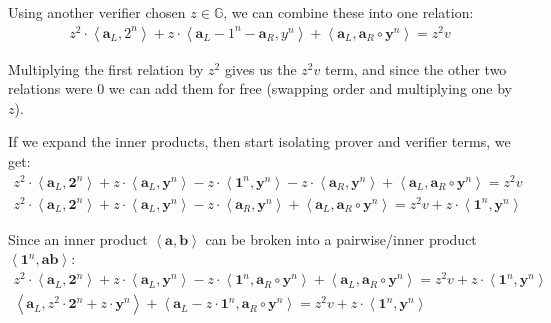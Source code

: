 \documentclass{article}
\begin{document}
Using another verifier chosen $z \in \mathbb{G}$, we can combine these into one relation:
\begin{align}
  z^2 \cdot \left<\textbf{a}_L, 2^n\right> + z \cdot \left<\textbf{a}_L - 1^n - \textbf{a}_R, y^n\right> + \left<\textbf{a}_L, \textbf{a}_R \circ \textbf{y}^n\right> = z^2 v
\end{align}

Multiplying the first relation by $z^2$ gives us the $z^2 v$ term, and since the other two relations were $0$ we can add them for free (swapping order and multiplying one by $z$).

If we expand the inner products, then start isolating prover and verifier terms, we get:
\begin{align}
  z^2 \cdot \left<\textbf{a}_L, \textbf{2}^n\right> + z \cdot \left<\textbf{a}_L, \textbf{y}^n\right> - z \cdot \left<\textbf{1}^n, \textbf{y}^n\right> - z \cdot \left<\textbf{a}_R, \textbf{y}^n\right> + \left<\textbf{a}_L, \textbf{a}_R \circ \textbf{y}^n\right> = z^2 v\\
  z^2 \cdot \left<\textbf{a}_L, \textbf{2}^n\right> + z \cdot \left<\textbf{a}_L, \textbf{y}^n\right> - z \cdot \left<\textbf{a}_R, \textbf{y}^n\right> + \left<\textbf{a}_L, \textbf{a}_R \circ \textbf{y}^n\right> = z^2 v + z \cdot \left<\textbf{1}^n, \textbf{y}^n\right>
\end{align}

Since an inner product $\left<\textbf{a}, \textbf{b}\right>$ can be broken into a pairwise/inner product $\left<\textbf{1}^n, \textbf{a} \textbf{b}\right>$:
\begin{align}
  z^2 \cdot \left<\textbf{a}_L, \textbf{2}^n\right> + z \cdot \left<\textbf{a}_L, \textbf{y}^n\right> - z \cdot \left<\textbf{1}^n, \textbf{a}_R \circ \textbf{y}^n\right> + \left<\textbf{a}_L, \textbf{a}_R \circ \textbf{y}^n\right> = z^2 v + z \cdot \left<\textbf{1}^n, \textbf{y}^n\right>\\
  \left<\textbf{a}_L, z^2 \cdot \textbf{2}^n + z \cdot \textbf{y}^n\right> + \left<\textbf{a}_L - z \cdot \textbf{1}^n, \textbf{a}_R \circ \textbf{y}^n\right> = z^2 v + z \cdot \left<\textbf{1}^n, \textbf{y}^n\right>
\end{align}
\end{document}
